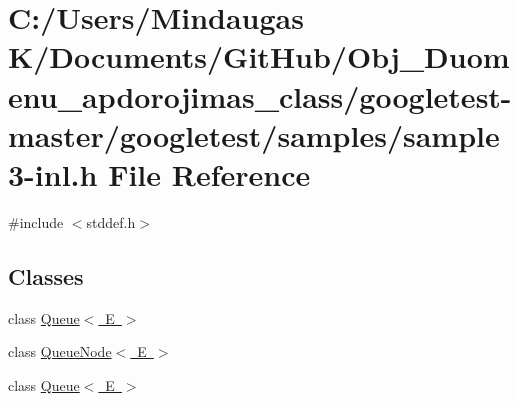 \hypertarget{googletest-master_2googletest_2samples_2sample3-inl_8h}{}\section{C\+:/\+Users/\+Mindaugas K/\+Documents/\+Git\+Hub/\+Obj\+\_\+\+Duomenu\+\_\+apdorojimas\+\_\+class/googletest-\/master/googletest/samples/sample3-\/inl.h File Reference}
\label{googletest-master_2googletest_2samples_2sample3-inl_8h}
{\ttfamily \#include $<$stddef.\+h$>$}\newline
\subsection*{Classes}
\begin{DoxyCompactItemize}
\item 
class \mbox{\hyperlink{class_queue}{Queue$<$ E $>$}}
\item 
class \mbox{\hyperlink{class_queue_node}{Queue\+Node$<$ E $>$}}
\item 
class \mbox{\hyperlink{class_queue}{Queue$<$ E $>$}}
\end{DoxyCompactItemize}
